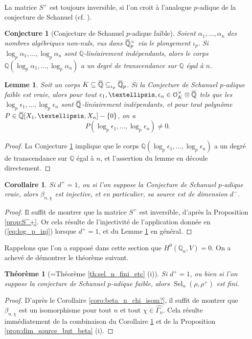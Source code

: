 \documentclass[12pt]{amsart}
\newcommand\bQ{\mathbb{Q}}
\newcommand\cO{\mathcal{O}}
\newcommand{\ob}[1]{\mkern 1.5mu\overline{\mkern-1.5mu#1\mkern-1.5mu}\mkern 1.5mu}
\DeclareMathOperator{\Sel}{Sel}
\theoremstyle{defstyle}
\theoremstyle{thmstyle}
\newtheorem{theorem}[subsubsection]{Théorème}
\newtheorem{lemme}[subsubsection]{Lemme}
\newtheorem{corollaire}[subsubsection]{Corollaire}
\newtheorem{conjecture}[subsubsection]{Conjecture}
\begin{document}
La matrice $S^+$ est toujours inversible, si l'on croit à l'analogue $p$-adique de la conjecture de Schanuel (cf. \cite[Conjecture 3.10]{mazurcalegari}). 

\begin{conjecture}[Conjecture de Schanuel $p$-adique faible]\label{conj:Schanuel}
	Soient $\alpha_1,\ldots,\alpha_n$ des nombres algébriques non-nuls, vus dans $\ob{\bQ}_p^\times$ via le plongement $\iota_p$. Si $\log_p \alpha_1,\ldots,\log_p \alpha_n$ sont $\bQ$-linéairement indépendants, alors le corps $\bQ(\log_p \alpha_1,\ldots,\log_p \alpha_n)$ a un degré de transcendance sur $\bQ$ égal à $n$.
\end{conjecture}

\begin{lemme}\label{lem:transcendance}
	Soit un corps $K \subseteq \ob{\bQ} \subseteq_{\iota_p} \ob{\bQ}_p$. Si la Conjecture de Schanuel $p$-adique faible est vraie, alors pour tout $\epsilon_1,\ldots,\epsilon_n \in \cO_K^\times \otimes \ob{\bQ}$ tels que les $\log_p \epsilon_1,\ldots,\log_p \epsilon_n$ sont $\ob{\bQ}$-linéairement indépendants, et pour tout polynôme $P\in \ob{\bQ}[X_1,\ldots,X_n]-\{0\}$, on a 
	$$P(\log_p \epsilon_1,\ldots,\log_p \epsilon_n)\neq 0.$$
\end{lemme}
\begin{proof}
	La Conjecture \ref{conj:Schanuel} implique que le corps $\bQ(\log_p \epsilon_1,\ldots,\log_p \epsilon_n)$ a un degré de transcendance sur $\bQ$ égal à $n$, et l'assertion du lemme en découle directement.
\end{proof}

\begin{corollaire}\label{coro:beta_n_chi_inj}
	Si $d^+=1$, ou si l'on suppose la Conjecture de Schanuel $p$-adique vraie, alors $\beta_{n,\chi}$ est injective, et en particulier, sa source est de dimension $d^-$.
\end{corollaire}
\begin{proof}
	Il suffit de montrer que la matrice $S^+$ est inversible, d'après la Proposition \ref{prop:S^+}. Or cela résulte de l'injectivité de l'application donnée en (\ref{eq:log_p_inj}) lorsque $d^+=1$, et du Lemme \ref{lem:transcendance} en général.
\end{proof}
Rappelons que l'on a supposé dans cette section que $H^0(\bQ_n,V)=0$. On a achevé de démontrer le théorème suivant.
\begin{theorem}[=Théorème \ref{th:sel_n_fini_etc} (i)] \label{th:sel_n_fini}
	 Si $d^+=1$, ou bien si l'on suppose la conjecture de Schanuel $p$-adique faible, alors $\Sel_n(\rho,\rho^+)$ est fini.
\end{theorem}
\begin{proof}
	D'après le Corollaire \ref{coro:beta_n_chi_isom?}, il suffit de montrer que $\beta_{n,\chi}$ est un isomorphisme pour tout $n$ et tout $\chi \in \widehat{\Gamma_n}$. Cela résulte immédiatement de la combinaison du Corollaire \ref{coro:beta_n_chi_inj} et de la Proposition \ref{prop:dim_source_but_beta} (i).
\end{proof}
\end{document}
